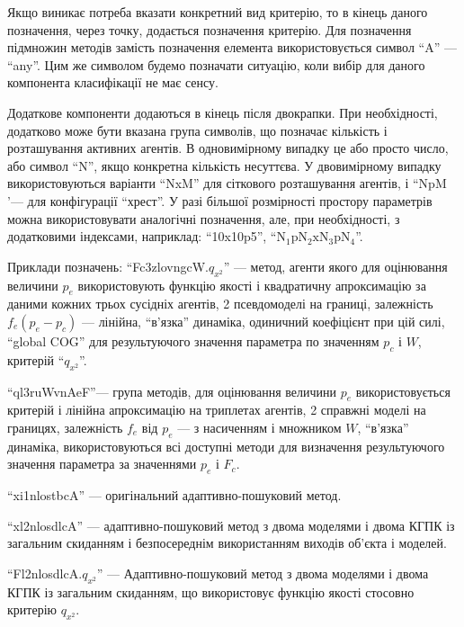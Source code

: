 Якщо виникає потреба вказати конкретний вид критерію, то в кінець даного
позначення, через точку, додається позначення критерію.
Для позначення підмножин методів замість позначення елемента використовується символ ``A'' --- ``any''.
Цим же символом будемо позначати ситуацію, коли вибір для даного
компонента класифікації не має сенсу.

Додаткове компоненти додаються в кінець після двокрапки. При
необхідності, додатково може бути вказана група символів, що
позначає кількість і розташування активних агентів.
В одновимірному випадку це або просто число, або символ ``N'',
якщо конкретна кількість несуттєва. У двовимірному випадку
використовуються варіанти ``NxM'' для сіткового розташування
агентів, і ``NpM '--- для конфігурації ``хрест''. У разі більшої
розмірності простору параметрів можна використовувати
аналогічні позначення, але, при необхідності, з додатковими
індексами, наприклад:
``10x10p5'', ``$\mathrm{N_1 p N_2 x N_3 p N_4}$''.

Приклади позначень:
``Fc3zlovngcW.$q_{x^2}$''
--- метод, агенти якого для оцінювання величини $p_e$ використовують функцію
якості і квадратичну апроксимацію за даними кожних трьох сусідніх агентів, 2
псевдомоделі на границі, залежність $f_e (p_e-p_c)$ --- лінійна, ``в'язка''
динаміка, одиничний коефіцієнт при цій силі, ``global COG'' для результуючого
значення параметра по значенням $p_c$ і $W$, критерій
``$q_{x^2}$''.



``ql3ruWvnAeF''---
група методів, для оцінювання величини
$ p_e $ використовується критерій і лінійна апроксимацію на
триплетах агентів, 2 справжні моделі на границях, залежність
$ f_e $ від $ p_e $ --- з насиченням і множником
$ W $, ``в'язка'' динаміка, використовуються всі доступні методи
для визначення результуючого значення параметра за значеннями  $ p_e $ і $ F_c $.

``xi1nlostbcA'' ---
оригінальний адаптивно-пошуковий метод.

``xl2nlosdlcA'' ---
адаптивно-пошуковий метод з двома моделями і двома КГПК із
загальним скиданням і безпосереднім використанням виходів
об'єкта і моделей.

``Fl2nlosdlcA.$q_{x^2}$'' ---
Адаптивно-пошуковий метод з двома моделями і двома КГПК із
загальним скиданням, що використовує функцію якості стосовно
критерію $q_{x^2}$.




